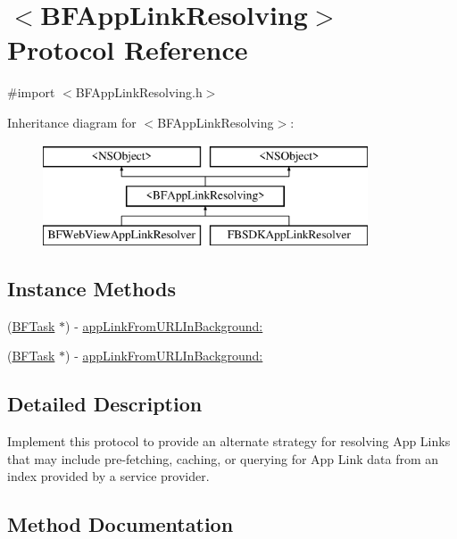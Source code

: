 \hypertarget{protocol_b_f_app_link_resolving-p}{}\section{$<$B\+F\+App\+Link\+Resolving$>$ Protocol Reference}
\label{protocol_b_f_app_link_resolving-p}


{\ttfamily \#import $<$B\+F\+App\+Link\+Resolving.\+h$>$}

Inheritance diagram for $<$B\+F\+App\+Link\+Resolving$>$\+:\begin{figure}[H]
\begin{center}
\leavevmode
\includegraphics[height=3.000000cm]{protocol_b_f_app_link_resolving-p}
\end{center}
\end{figure}
\subsection*{Instance Methods}
\begin{DoxyCompactItemize}
\item 
(\hyperlink{class_b_f_task}{B\+F\+Task} $\ast$) -\/ \hyperlink{protocol_b_f_app_link_resolving-p_a78b6f44fe77610b147cb08dc1644cc35}{app\+Link\+From\+U\+R\+L\+In\+Background\+:}
\item 
(\hyperlink{class_b_f_task}{B\+F\+Task} $\ast$) -\/ \hyperlink{protocol_b_f_app_link_resolving-p_a78b6f44fe77610b147cb08dc1644cc35}{app\+Link\+From\+U\+R\+L\+In\+Background\+:}
\end{DoxyCompactItemize}


\subsection{Detailed Description}
Implement this protocol to provide an alternate strategy for resolving App Links that may include pre-\/fetching, caching, or querying for App Link data from an index provided by a service provider. 

\subsection{Method Documentation}
\hypertarget{protocol_b_f_app_link_resolving-p_a78b6f44fe77610b147cb08dc1644cc35}{}
